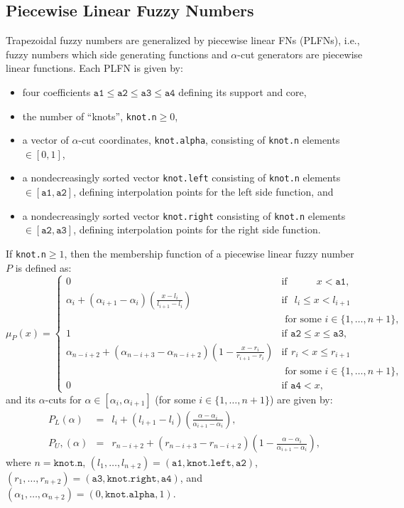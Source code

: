 \documentclass[11pt]{article}\usepackage[]{graphicx}\usepackage[]{color}
\newcommand{\hlkwc}[1]{\textcolor[rgb]{0.333,0.667,0.333}{#1}}%
\newcommand{\argument}[1]{\texttt{\hlkwc{#1}}}
\begin{document}
\subsection{Piecewise Linear Fuzzy Numbers}

Trapezoidal fuzzy numbers are generalized by piecewise linear FNs (PLFNs),
i.e., fuzzy numbers which side generating functions and $\alpha$-cut
generators are piecewise linear functions.
Each PLFN is given by:
\begin{itemize}
\item four coefficients $\mathtt{a1}\le\mathtt{a2}\le\mathtt{a3}\le\mathtt{a4}$
defining its support and core,
\item the number of ``knots'', \argument{knot.n}$\ge 0$,
\item a vector of $\alpha$-cut coordinates, \argument{knot.alpha}, consisting of \argument{knot.n} elements $\in[0,1]$,
\item a nondecreasingly sorted vector \argument{knot.left} consisting of \argument{knot.n} elements $\in[\mathtt{a1},\mathtt{a2}]$,
defining interpolation points for the left side function, and
\item a nondecreasingly sorted vector \argument{knot.right} consisting of \argument{knot.n} elements $\in[\mathtt{a2},\mathtt{a3}]$,
defining interpolation points for the right side function.
\end{itemize}

If \argument{knot.n}$\ge 1$, then the membership function of
a piecewise linear fuzzy number $P$ is defined as:
\begin{equation}
\mu_P(x) = \left\{\begin{array}{ll}
0 & \text{if } \phantom{\mathtt{a2}\le\ } x<\mathtt{a1}, \\
\alpha_i+(\alpha_{i+1}-\alpha_i) \left(\frac{x-l_i}{l_{i+1}-l_i}\right)  & \text{if }\ \, l_i \le x < l_{i+1}\\
& \text{ for some } i\in\{1,\dots,n+1\}, \\
1 & \text{if } \mathtt{a2}\le x\le\mathtt{a3}, \\
\alpha_{n-i+2}+(\alpha_{n-i+3}-\alpha_{n-i+2}) \left(1-\frac{x-r_i}{r_{i+1}-r_i}\right)  & \text{if}\ \, r_i < x \le r_{i+1} \\
& \text{ for some } i\in\{1,\dots,n+1\}, \\
0 & \text{if } \mathtt{a4}<x,
\end{array}\right.
\end{equation}
and its $\alpha$-cuts for $\alpha\in[\alpha_i, \alpha_{i+1}]$
(for some $i\in\{1,\dots,n+1\}$) are given by:
\begin{eqnarray}
P_L(\alpha) & = & l_i+(l_{i+1}-l_i)\left(\frac{\alpha-\alpha_i}{\alpha_{i+1}-\alpha_i}\right), \\
P_U,(\alpha) & = & r_{n-i+2}+(r_{n-i+3}-r_{n-i+2})\left(1-\frac{\alpha-\alpha_i}{\alpha_{i+1}-\alpha_i}\right),
\end{eqnarray}
where $n=\mathtt{knot.n}$, $(l_1,\dots,l_{n+2}) = (\mathtt{a1},\mathtt{knot.left},\mathtt{a2})$,
$(r_1,\dots,r_{n+2}) = (\mathtt{a3},\mathtt{knot.right},\mathtt{a4})$,
and $(\alpha_1,\dots,\alpha_{n+2})=(0,\mathtt{knot.alpha},1)$.
\end{document}

